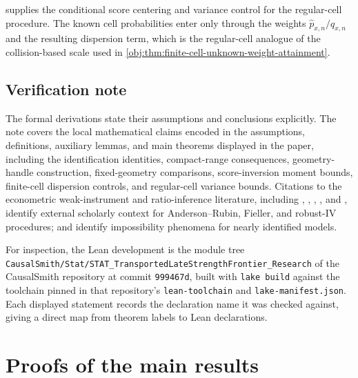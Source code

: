 \documentclass[11pt]{article}
\begin{document}
 supplies the conditional score centering and variance control for the regular-cell procedure. The known cell probabilities enter only through the weights \(\widehat p_{x,n}/q_{x,n}\) and the resulting dispersion term, which is the regular-cell analogue of the collision-based scale used in \cref{obj:thm:finite-cell-unknown-weight-attainment}.

\subsection{Verification note}

The formal derivations state their assumptions and conclusions explicitly. The note covers the local mathematical claims encoded in the assumptions, definitions, auxiliary lemmas, and main theorems displayed in the paper, including the identification identities, compact-range consequences, geometry-handle construction, fixed-geometry comparisons, score-inversion moment bounds, finite-cell dispersion controls, and regular-cell variance bounds. Citations to the econometric weak-instrument and ratio-inference literature, including \citet{AndersonRubin1949}, \citet{Fieller1954}, \citet{Moreira2003}, \citet{AndrewsMoreiraStock2006}, and \citet{Mikusheva2010}, identify external scholarly context for Anderson--Rubin, Fieller, and robust-IV procedures; \citet{GleserHwang1987} and \citet{Dufour1997} identify impossibility phenomena for nearly identified models.

For inspection, the Lean development is the module tree \texttt{CausalSmith/Stat/STAT\_TransportedLateStrengthFrontier\_Research} of the CausalSmith repository at commit \texttt{999467d}, built with \texttt{lake build} against the toolchain pinned in that repository's \texttt{lean-toolchain} and \texttt{lake-manifest.json}. Each displayed statement records the declaration name it was checked against, giving a direct map from theorem labels to Lean declarations.


\section{Proofs of the main results}\label{sec:deferred-proofs}
\end{document}
